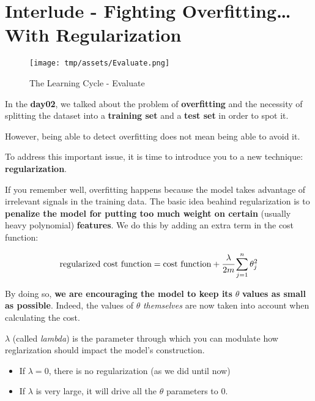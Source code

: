 \documentclass[]{article}
\begin{document}
\clearpage

\hypertarget{interlude---fighting-overfitting-with-regularization}{%
\section{Interlude - Fighting Overfitting\ldots{} With
Regularization}\label{interlude---fighting-overfitting-with-regularization}}

\begin{figure}
\centering
\texttt{[image: tmp/assets/Evaluate.png]}
\caption{The Learning Cycle - Evaluate}
\end{figure}

In the \textbf{day02}, we talked about the problem of
\textbf{overfitting} and the necessity of splitting the dataset into a
\textbf{training set} and a \textbf{test set} in order to spot it.

However, being able to detect overfitting does not mean being able to
avoid it.

To address this important issue, it is time to introduce you to a new
technique: \textbf{regularization}.

If you remember well, overfitting happens because the model takes
advantage of irrelevant signals in the training data. The basic idea
beahind regularization is to \textbf{penalize the model for putting too
much weight on certain} (usually heavy polynomial) \textbf{features}. We
do this by adding an extra term in the cost function:

\large

\[
\text{regularized cost function} = \text{cost function} + \cfrac{\lambda}{2m} \sum_{j = 1}^n \theta_j^2
\] \normalsize

By doing so, \textbf{we are encouraging the model to keep its}
\(\theta\) \textbf{values as small as possible}. Indeed, the values of
\(\theta\) \emph{themselves} are now taken into account when calculating
the cost.

\(\lambda\) (called \emph{lambda}) is the parameter through which you
can modulate how reglarization should impact the model's construction.

\begin{itemize}
\item
  If \(\lambda = 0\), there is no regularization (as we did until now)
\item
  If \(\lambda\) is very large, it will drive all the \(\theta\)
  parameters to \(0\).
\end{itemize}
\end{document}
